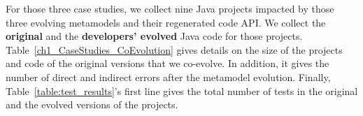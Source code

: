 For those three case studies, we collect nine Java projects impacted by those three evolving metamodels and their regenerated code API. We collect the \textbf{original} and the \textbf{developers' evolved} Java code for those projects.
%
Table~\ref{ch1_CaseStudies_CoEvolution} gives details on the size of the projects and code of the original versions that we co-evolve.  In addition, it gives the number of direct and indirect errors after the metamodel evolution. Finally, Table~\ref{table:test_results}'s first line gives the total number of tests in the original and the evolved versions of the projects.

